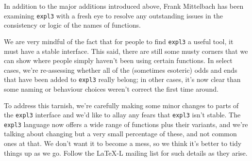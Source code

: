 \documentclass{ltnews}
\begin{document}
In addition to the major additions introduced above, Frank Mittelbach has been examining \texttt{expl3} with a fresh eye to resolve any outstanding issues in the consistency or logic of the names of functions.

We are very mindful of the fact that for people to find \texttt{expl3} a useful tool, it must have a stable interface.
This said, there are still some musty corners that we can show where people simply haven't been using certain functions.
In select cases, we're re-assessing whether all of the (sometimes esoteric) odds and ends that have been added to \texttt{expl3} really belong; in other cases, it's now clear than some naming or behaviour choices weren't correct the first time around.

To address this tarnish, we're carefully making some minor changes to parts of the \texttt{expl3} interface and we'd like to allay any fears that \texttt{expl3} isn't stable.
The \texttt{expl3} language now offers a wide range of functions plus their variants, and we're talking about changing but a very small percentage of these, and not common ones at that.
We don't want it to become a mess, so we think it's better to tidy things up as we go.
Follow the LaTeX-L mailing list for such details as they arise.
\end{document}
